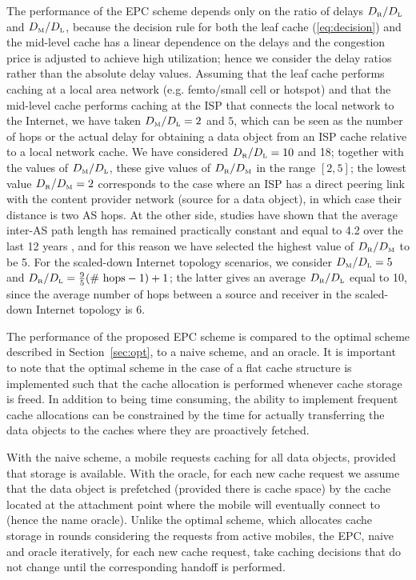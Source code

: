 \documentclass[conference]{IEEEtran}
\newcommand{\mynote}[1]{{{\medskip
\footnotesize \em \noindent Note: #1}}\medskip}
\newcommand{\mynotex}[1]{}
\renewcommand{\mynote}[1]{}
\newcommand{\M}{\mbox{\tiny M}}
\newcommand{\Leaf}{\mbox{\tiny L}}
\newcommand{\R}{\mbox{\tiny R}}
\begin{document}
The performance of the EPC scheme depends only on the ratio of delays $D_{\R}/D_{\Leaf}$ and $D_{\M}/D_{\Leaf}$, because the decision rule for both the leaf cache (\ref{eq:decision}) and the mid-level cache has a linear dependence on the delays and the congestion price is adjusted to achieve high utilization; hence we consider the delay ratios rather than the absolute delay values.
Assuming that the leaf cache performs caching at a local area network (e.g.  femto/small cell or hotspot) and that the mid-level cache performs caching at the ISP that connects the local network to the Internet, we have taken  $D_{\M}/D_{\Leaf}=2$ and $5$, which can be seen as the number of hops or the actual delay for obtaining a data object from an ISP cache relative to a local network cache.
We have considered $D_{\R}/D_{\Leaf}= 10$ and 18; together with the values of  $D_{\M}/D_{\Leaf}$, these give values of $D_{\R}/D_{\M}$ in the range $[ 2, 5]$; the lowest value $D_{\R}/D_{\M}=2$ corresponds to the case where an ISP has a direct peering link with the content provider network (source for a data object), in which case their distance is two AS hops.
At the other side, studies have shown that the average inter-AS path length has remained practically constant and equal to 4.2 over the last 12 years \cite{Dha+11}, and for this reason we have selected the highest value of $D_{\R}/D_{\M}$ to be 5. For the scaled-down Internet topology scenarios, we consider $D_{\M}/D_{\Leaf}=5$ and $D_{\R}/D_{\Leaf}=\frac{9}{5} (\mbox{\# hops}-1)+1$; the latter gives an average  $D_{\R}/D_{\Leaf}$ equal to 10, since the average number of hops between a source and receiver in the scaled-down Internet topology is 6.


\mynotex{why we take ratio of delays}

\mynote{XV: how do we define neighborhood}


The performance of the proposed EPC scheme is compared to the optimal scheme described in Section~\ref{sec:opt},  to a naive scheme, and an oracle.
It is important to note that the optimal scheme in the case of a flat cache structure is implemented such that the cache allocation is performed whenever cache storage is freed. In addition to being time consuming, the ability to implement frequent cache allocations can be constrained by the time for actually transferring the data objects to the caches where they are proactively fetched.

With the naive scheme, a mobile requests caching for all data objects, provided that storage is available. With the oracle, for each new cache request we assume that the data object is prefetched (provided there is cache space) by the cache located at  the attachment point where the mobile will eventually connect to (hence the name oracle). Unlike the optimal scheme, which allocates cache storage in rounds considering the requests from active mobiles,  the EPC, naive and oracle iteratively, for each new cache request, take caching decisions that do not change until the corresponding handoff is performed.
\end{document}
